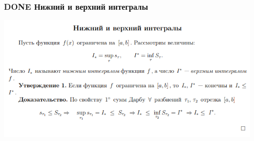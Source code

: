 \documentclass[11pt]{article}
\begin{document}
\subsubsection{{\bfseries\sffamily DONE} Нижний и верхний интегралы}
\label{sec:org12cd626}
\begin{center}
\includegraphics[width=.9\linewidth]{img/b2-nvint.png}
\end{center}
\end{document}
